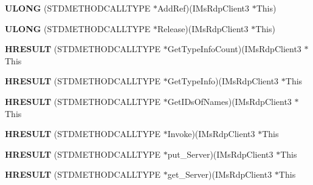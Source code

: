 \begin{DoxyCompactItemize}
\item 
\mbox{\label{struct_i_ms_rdp_client3_vtbl_a2b7d6a7efa9269c2a7ecc272fdc3dae8}} 
{\bfseries U\+L\+O\+NG} (S\+T\+D\+M\+E\+T\+H\+O\+D\+C\+A\+L\+L\+T\+Y\+PE $\ast$Add\+Ref)(I\+Ms\+Rdp\+Client3 $\ast$This)
\item 
\mbox{\label{struct_i_ms_rdp_client3_vtbl_a1cbd6fa50c82f8c92d93888f6b967118}} 
{\bfseries U\+L\+O\+NG} (S\+T\+D\+M\+E\+T\+H\+O\+D\+C\+A\+L\+L\+T\+Y\+PE $\ast$Release)(I\+Ms\+Rdp\+Client3 $\ast$This)
\item 
\mbox{\label{struct_i_ms_rdp_client3_vtbl_a661bbfc95cebc719b5b15180bfd5c575}} 
{\bfseries H\+R\+E\+S\+U\+LT} (S\+T\+D\+M\+E\+T\+H\+O\+D\+C\+A\+L\+L\+T\+Y\+PE $\ast$Get\+Type\+Info\+Count)(I\+Ms\+Rdp\+Client3 $\ast$This
\item 
\mbox{\label{struct_i_ms_rdp_client3_vtbl_a69b649138c90b4f0582675b880e43406}} 
{\bfseries H\+R\+E\+S\+U\+LT} (S\+T\+D\+M\+E\+T\+H\+O\+D\+C\+A\+L\+L\+T\+Y\+PE $\ast$Get\+Type\+Info)(I\+Ms\+Rdp\+Client3 $\ast$This
\item 
\mbox{\label{struct_i_ms_rdp_client3_vtbl_a617e0423e8784871b15759d8f7d9c576}} 
{\bfseries H\+R\+E\+S\+U\+LT} (S\+T\+D\+M\+E\+T\+H\+O\+D\+C\+A\+L\+L\+T\+Y\+PE $\ast$Get\+I\+Ds\+Of\+Names)(I\+Ms\+Rdp\+Client3 $\ast$This
\item 
\mbox{\label{struct_i_ms_rdp_client3_vtbl_ad59ba2fadc8b39316c42889ba2337bb5}} 
{\bfseries H\+R\+E\+S\+U\+LT} (S\+T\+D\+M\+E\+T\+H\+O\+D\+C\+A\+L\+L\+T\+Y\+PE $\ast$Invoke)(I\+Ms\+Rdp\+Client3 $\ast$This
\item 
\mbox{\label{struct_i_ms_rdp_client3_vtbl_ab236f6773847adf8b67a2084cae71517}} 
{\bfseries H\+R\+E\+S\+U\+LT} (S\+T\+D\+M\+E\+T\+H\+O\+D\+C\+A\+L\+L\+T\+Y\+PE $\ast$put\+\_\+\+Server)(I\+Ms\+Rdp\+Client3 $\ast$This
\item 
\mbox{\label{struct_i_ms_rdp_client3_vtbl_a14d8eb6f891f3d3a453b8b2917b784ea}} 
{\bfseries H\+R\+E\+S\+U\+LT} (S\+T\+D\+M\+E\+T\+H\+O\+D\+C\+A\+L\+L\+T\+Y\+PE $\ast$get\+\_\+\+Server)(I\+Ms\+Rdp\+Client3 $\ast$This

\end{DoxyCompactItemize}
